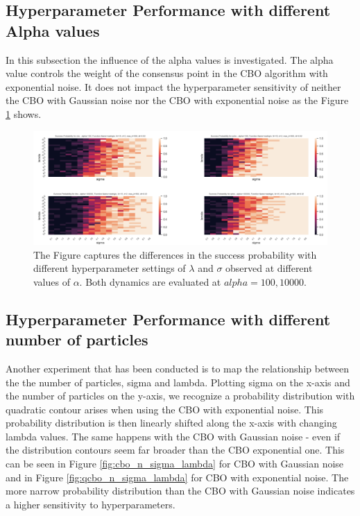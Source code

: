 \documentclass[a4paper, 11pt]{article}
\begin{document}
\subsection{Hyperparameter Performance with different Alpha values}
In this subsection the influence of the alpha values is investigated. The alpha value controls the weight of the consensus point in the CBO algorithm with exponential noise. It does not impact the hyperparameter sensitivity of neither the CBO with Gaussian noise nor the CBO with exponential noise as the Figure \ref{fig:alpha_sigma_lambda} shows. 

\begin{figure}[!ht]
\centering
\includegraphics[width=1\textwidth]{imgs/alpha_sigma_lambda.jpg}

\caption{The Figure captures the differences in the success probability with different hyperparameter settings of $\lambda$ and $\sigma$ observed at different values of $\alpha$. Both dynamics are evaluated at $alpha = 100, 10000$.} \vspace{-1em}
\label{fig:alpha_sigma_lambda}
\end{figure}


\subsection{Hyperparameter Performance with different number of particles}
Another experiment that has been conducted is to map the relationship between the the number of particles, sigma and lambda. Plotting sigma on the x-axis and the number of particles on the y-axis, we recognize a probability distribution with quadratic contour arises when using the CBO with exponential noise. This probability distribution is then linearly shifted along the x-axis with changing lambda values. The same happens with the CBO with Gaussian noise - even if the distribution contours seem far broader than the CBO exponential one. This can be seen in Figure \ref{fig:cbo_n_sigma_lambda} for CBO with Gaussian noise and in Figure \ref{fig:qcbo_n_sigma_lambda} for CBO with exponential noise. The more narrow probability distribution than the CBO with Gaussian noise indicates a higher sensitivity to hyperparameters.
\end{document}
